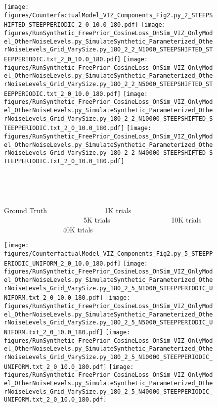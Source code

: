 \documentclass{article}
\begin{document}
\begin{figure}
\texttt{[image: figures/CounterfactualModel\_VIZ\_Components\_Fig2.py\_2\_STEEPSHIFTED\_STEEPPERIODIC\_2\_0\_10.0\_180.pdf]}
\texttt{[image: figures/RunSynthetic\_FreePrior\_CosineLoss\_OnSim\_VIZ\_OnlyModel\_OtherNoiseLevels.py\_SimulateSynthetic\_Parameterized\_OtherNoiseLevels\_Grid\_VarySize.py\_180\_2\_2\_N1000\_STEEPSHIFTED\_STEEPPERIODIC.txt\_2\_0\_10.0\_180.pdf]}
\texttt{[image: figures/RunSynthetic\_FreePrior\_CosineLoss\_OnSim\_VIZ\_OnlyModel\_OtherNoiseLevels.py\_SimulateSynthetic\_Parameterized\_OtherNoiseLevels\_Grid\_VarySize.py\_180\_2\_2\_N5000\_STEEPSHIFTED\_STEEPPERIODIC.txt\_2\_0\_10.0\_180.pdf]}
\texttt{[image: figures/RunSynthetic\_FreePrior\_CosineLoss\_OnSim\_VIZ\_OnlyModel\_OtherNoiseLevels.py\_SimulateSynthetic\_Parameterized\_OtherNoiseLevels\_Grid\_VarySize.py\_180\_2\_2\_N10000\_STEEPSHIFTED\_STEEPPERIODIC.txt\_2\_0\_10.0\_180.pdf]}
\texttt{[image: figures/RunSynthetic\_FreePrior\_CosineLoss\_OnSim\_VIZ\_OnlyModel\_OtherNoiseLevels.py\_SimulateSynthetic\_Parameterized\_OtherNoiseLevels\_Grid\_VarySize.py\_180\_2\_2\_N40000\_STEEPSHIFTED\_STEEPPERIODIC.txt\_2\_0\_10.0\_180.pdf]}

\ \ 

\ \ 

Ground Truth
  \ \  \ \ \ \  \ \  \ \ \ \ \ \ \ \ 
 1K trials
  \ \  \ \  \ \  \ \ \ \ \ \ \ \ \ \ \ \ \ \ \ \ \  
 5K trials
  \ \  \ \  \ \  \ \ \ \ \ \ \ \ \ \ \ 
 10K trials 
 \ \  \ \  \ \  \ \ \ \ \ \ \ \ \ \ \ 
40K trials
\ \ \ \ \ 


\texttt{[image: figures/CounterfactualModel\_VIZ\_Components\_Fig2.py\_5\_STEEPPERIODIC\_UNIFORM\_2\_0\_10.0\_180.pdf]}
\texttt{[image: figures/RunSynthetic\_FreePrior\_CosineLoss\_OnSim\_VIZ\_OnlyModel\_OtherNoiseLevels.py\_SimulateSynthetic\_Parameterized\_OtherNoiseLevels\_Grid\_VarySize.py\_180\_2\_5\_N1000\_STEEPPERIODIC\_UNIFORM.txt\_2\_0\_10.0\_180.pdf]}
\texttt{[image: figures/RunSynthetic\_FreePrior\_CosineLoss\_OnSim\_VIZ\_OnlyModel\_OtherNoiseLevels.py\_SimulateSynthetic\_Parameterized\_OtherNoiseLevels\_Grid\_VarySize.py\_180\_2\_5\_N5000\_STEEPPERIODIC\_UNIFORM.txt\_2\_0\_10.0\_180.pdf]}
\texttt{[image: figures/RunSynthetic\_FreePrior\_CosineLoss\_OnSim\_VIZ\_OnlyModel\_OtherNoiseLevels.py\_SimulateSynthetic\_Parameterized\_OtherNoiseLevels\_Grid\_VarySize.py\_180\_2\_5\_N10000\_STEEPPERIODIC\_UNIFORM.txt\_2\_0\_10.0\_180.pdf]}
\texttt{[image: figures/RunSynthetic\_FreePrior\_CosineLoss\_OnSim\_VIZ\_OnlyModel\_OtherNoiseLevels.py\_SimulateSynthetic\_Parameterized\_OtherNoiseLevels\_Grid\_VarySize.py\_180\_2\_5\_N40000\_STEEPPERIODIC\_UNIFORM.txt\_2\_0\_10.0\_180.pdf]}



\end{figure}
\end{document}
